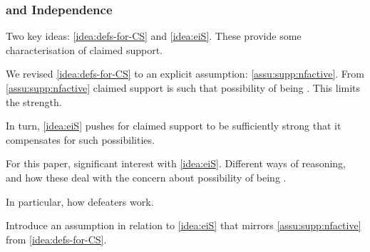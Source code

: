 \subsubsection{ and Independence}
\label{sec:two-assumpt-regard}
\label{sec:claim-supp-requ}

\begin{note}
  Two key ideas: \autoref{idea:defs-for-CS} and \autoref{idea:eiS}.
  These provide some characterisation of claimed support.

  We revised \autoref{idea:defs-for-CS} to an explicit assumption: \autoref{assu:supp:nfactive}.
  From \autoref{assu:supp:nfactive} claimed support is such that possibility of being \mom{}.
  This limits the strength.

  In turn, \autoref{idea:eiS} pushes for claimed support to be sufficiently strong that it compensates for such possibilities.

  For this paper, significant interest with \autoref{idea:eiS}.
  Different ways of reasoning, and how these deal with the concern about possibility of being \mom{}.

  In particular, how defeaters work.

  Introduce an assumption in relation to \autoref{idea:eiS} that mirrors \autoref{assu:supp:nfactive} from \autoref{idea:defs-for-CS}.
\end{note}

